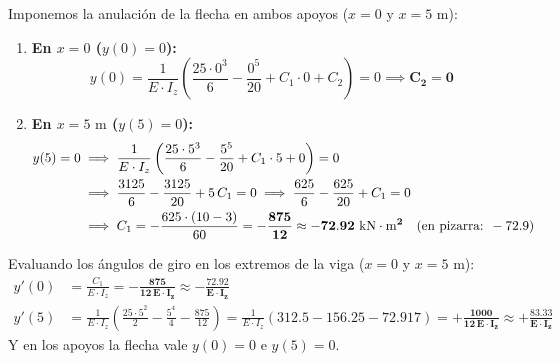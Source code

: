 {    

    Imponemos la anulación de la flecha en ambos apoyos ($x = 0$ y $x = 5\text{ m}$):
    \begin{enumerate}
        \item \textbf{En $x = 0$ ($y(0) = 0$):}
              \begin{equation}
                  y(0) = \frac{1}{E \cdot I_z} \left( \frac{25 \cdot 0^3}{6} - \frac{0^5}{20} + C_1 \cdot 0 + C_2 \right) = 0 \implies \mathbf{C_2 = 0}
              \end{equation}
        \item \textbf{En $x = 5\text{ m}$ ($y(5) = 0$):}
              \begin{align}
                  y(5) = 0 & \implies \frac{1}{E \cdot I_z} \left( \frac{25 \cdot 5^3}{6} - \frac{5^5}{20} + C_1 \cdot 5 + 0 \right) = 0 \notag \\
                           & \implies \frac{3125}{6} - \frac{3125}{20} + 5\,C_1 = 0 \implies \frac{625}{6} - \frac{625}{20} + C_1 = 0 \notag   \\
                           & \implies C_1 = -\frac{625 \cdot (10 - 3)}{60} = \mathbf{-\frac{875}{12} \approx -72.92\text{ kN}\cdot\text{m}^2} \quad (\text{en pizarra: } -72.9)
              \end{align}
    \end{enumerate}

    Evaluando los ángulos de giro en los extremos de la viga ($x = 0$ y $x = 5\text{ m}$):
    \begin{align}
        y'(0) & = \frac{C_1}{E \cdot I_z} = \mathbf{-\frac{875}{12\,E \cdot I_z} \approx -\frac{72.92}{E \cdot I_z}}                                                                                                     \\
        y'(5) & = \frac{1}{E \cdot I_z} \left( \frac{25 \cdot 5^2}{2} - \frac{5^4}{4} - \frac{875}{12} \right) = \frac{1}{E \cdot I_z} \left( 312.5 - 156.25 - 72.917 \right) = \mathbf{+\frac{1000}{12\,E \cdot I_z} \approx +\frac{83.33}{E \cdot I_z}}
    \end{align}
    Y en los apoyos la flecha vale $y(0) = 0$ e $y(5) = 0$.


}
